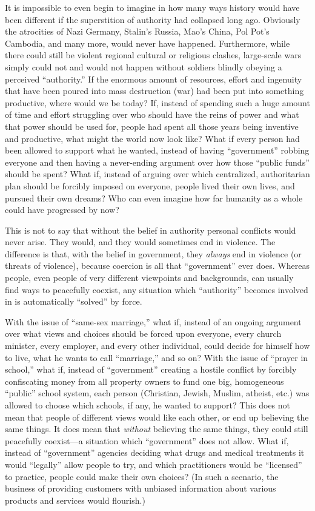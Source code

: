 \documentclass{book}
\begin{document}
It is impossible to even begin to imagine in how many ways history would have been different if the superstition of authority had collapsed long ago. Obviously the atrocities of Nazi Germany, Stalin's Russia, Mao's China, Pol Pot's Cambodia, and many more, would never have happened. Furthermore, while there could still be violent regional cultural or religious clashes, large-scale wars simply could not and would not happen without soldiers blindly obeying a perceived \enquote{authority.} If the enormous amount of resources, effort and ingenuity that have been poured into mass destruction (war) had been put into something productive, where would we be today? If, instead of spending such a huge amount of time and effort struggling over who should have the reins of power and what that power should be used for, people had spent all those years being inventive and productive, what might the world now look like? What if every person had been allowed to support what he wanted, instead of having \enquote{government} robbing everyone and then having a never-ending argument over how those \enquote{public funds} should be spent? What if, instead of arguing over which centralized, authoritarian plan should be forcibly imposed on everyone, people lived their own lives, and pursued their own dreams? Who can even imagine how far humanity as a whole could have progressed by now?

This is not to say that without the belief in authority personal conflicts would never arise. They would, and they would sometimes end in violence. The difference is that, with the belief in government, they \emph{always} end in violence (or threats of violence), because coercion is all that \enquote{government} ever does. Whereas people, even people of very different viewpoints and backgrounds, can usually find ways to peacefully coexist, any situation which \enquote{authority} becomes involved in is automatically \enquote{solved} by force.

With the issue of \enquote{same-sex marriage,} what if, instead of an ongoing argument over what views and choices should be forced upon everyone, every church minister, every employer, and every other individual, could decide for himself how to live, what he wants to call \enquote{marriage,} and so on? With the issue of \enquote{prayer in school,} what if, instead of \enquote{government} creating a hostile conflict by forcibly confiscating money from all property owners to fund one big, homogeneous \enquote{public} school system, each person (Christian, Jewish, Muslim, atheist, etc.) was allowed to choose which schools, if any, he wanted to support? This does not mean that people of different views would like each other, or end up believing the same things. It does mean that \emph{without} believing the same things, they could still peacefully coexist---a situation which \enquote{government} does not allow. What if, instead of \enquote{government} agencies deciding what drugs and medical treatments it would \enquote{legally} allow people to try, and which practitioners would be \enquote{licensed} to practice, people could make their own choices? (In such a scenario, the business of providing customers with unbiased information about various products and services would flourish.)
\end{document}
